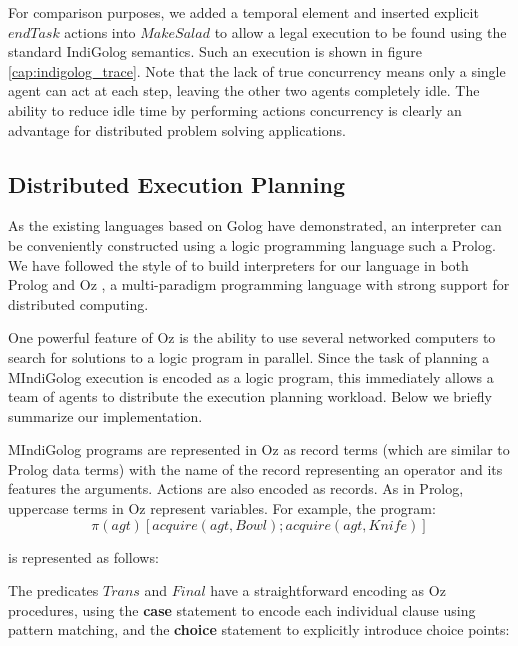 For comparison purposes, we added a temporal element and inserted
explicit $endTask$ actions into $MakeSalad$ to allow a legal execution
to be found using the standard IndiGolog semantics. Such an execution
is shown in figure \ref{cap:indigolog_trace}. Note that the lack
of true concurrency means only a single agent can act at each step,
leaving the other two agents completely idle. The ability to reduce
idle time by performing actions concurrency is clearly an advantage
for distributed problem solving applications.


\subsection{Distributed Execution Planning}

As the existing languages based on Golog have demonstrated, an interpreter
can be conveniently constructed using a logic programming language
such a Prolog. We have followed the style of \cite{giacomo00congolog,giacomo99indigolog}
to build interpreters for our language in both Prolog and Oz \cite{vanroy03mozart_logic},
a multi-paradigm programming language with strong support for distributed
computing.

One powerful feature of Oz is the ability to use several networked
computers to search for solutions to a logic program in parallel.
Since the task of planning a MIndiGolog execution is encoded as a
logic program, this immediately allows a team of agents to distribute
the execution planning workload. Below we briefly summarize our implementation.

MIndiGolog programs are represented in Oz as record terms (which are
similar to Prolog data terms) with the name of the record representing
an operator and its features the arguments. Actions are also encoded
as records. As in Prolog, uppercase terms in Oz represent variables.
For example, the program:\[
\pi(agt)\left[acquire(agt,Bowl);acquire(agt,Knife)\right]\]


is represented as follows:

{\small  }{\small \par}

The predicates $Trans$ and $Final$ have a straightforward encoding
as Oz procedures, using the \textbf{case} statement to encode each
individual clause using pattern matching, and the \textbf{choice}
statement to explicitly introduce choice points:

{\small  }{\small \par}


